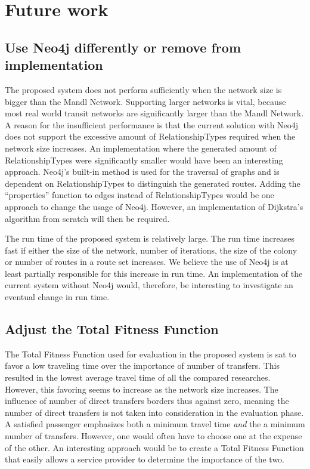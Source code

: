 \section{Future work}
\label{sec:futureWork}

\subsection*{Use Neo4j differently or remove from implementation}
The proposed system does not perform sufficiently when the network size is bigger than the Mandl Network. Supporting larger networks is vital, because most real world transit networks are significantly larger than the Mandl Network. A reason for the insufficient performance is that the current solution with Neo4j does not support the excessive amount of RelationshipTypes required when the network size increases. An implementation where the generated amount of RelationshipTypes were significantly smaller would have been an interesting approach. Neo4j's built-in method is used for the traversal of graphs and is dependent on RelationshipTypes to distinguish the generated routes. Adding the ``properties'' function to edges instead of RelationshipTypes would be one approach to change the usage of Neo4j. However, an implementation of Dijkstra's algorithm from scratch will then be required.  


The run time of the proposed system is relatively large. The run time increases fast if either the size of the network, number of iterations, the size of the colony or number of routes in a route set increases. We believe the use of Neo4j is at least partially responsible for this increase in run time. An implementation of the current system without Neo4j would, therefore, be interesting to investigate an eventual change in run time.  

\subsection*{Adjust the Total Fitness Function}
The Total Fitness Function used for evaluation in the proposed system is sat to favor a low traveling time over the importance of number of transfers. This resulted in the lowest average travel time of all the compared researches. However, this favoring seems to increase as the network size increases. The influence of number of direct transfers borders thus against zero, meaning the number of direct transfers is not taken into consideration in the evaluation phase. A satisfied passenger emphasizes both a minimum travel time \textit{and} the a minimum number of transfers. However, one would often have to choose one at the expense of the other. An interesting approach would be to create a Total Fitness Function that easily allows a service provider to determine the importance of the two.

